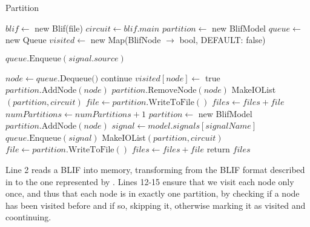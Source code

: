 \documentclass[12pt,final,oneside]{article} %
\begin{document}
\begin{algorithm}
   \caption{Partition}\label{partitioner}
   \begin{algorithmic}[1]
            \State $blif \gets$ new Blif(file) 
            \State $circuit \gets blif.main$ 
            \State $partition \gets$ new BlifModel 
            \State $queue \gets$ new Queue 
            \State $visited \gets$ new Map(BlifNode $\to$ bool, DEFAULT: false)

               \State $queue.\mbox{Enqueue}(signal.source)$
            \EndFor

               \State $node \gets queue.\mbox{Dequeue()}$
                  \State continue 
               \EndIf
               \State $visited[node] \gets $ true
               \State $partition.\mbox{AddNode}(node)$
                  \State $partition.\mbox{RemoveNode}(node)$
                  \State MakeIOList$(partition, circuit)$
                  \State $file \gets partition.\mbox{WriteToFile}()$
                  \State $files \gets files+file$
                  \State $numPartitions \gets numPartitions+1$
                  \State $partition \gets$ new BlifModel 
                  \State $partition.\mbox{AddNode}(node)$
               \EndIf
                  \State $signal \gets model.signals[signalName]$
                  \State $queue.\mbox{Enqueue}(signal)$
               \EndFor
            \EndWhile
               \State MakeIOList$(partition, circuit)$
               \State $file \gets partition.\mbox{WriteToFile}()$
               \State $files \gets files+file$
            \EndIf
            \State return $files$
         \EndProcedure
   \end{algorithmic}
\end{algorithm}
\FloatBarrier
Line 2 reads a \ac{BLIF} into memory, transforming from the \ac{BLIF} format described in  to the one represented by .
Lines 12-15 ensure that we visit each node only once, and thus that each node is in exactly one partition, by checking if a node has been visited before and if so, skipping it, otherwise marking it as visited and coontinuing.
\end{document}

